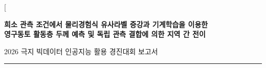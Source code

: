 \documentclass[10pt,twocolumn]{article}
\begin{document}
\pagestyle{plain}
\raggedbottom

\twocolumn[%
\begin{@twocolumnfalse}
\begin{center}
{\headfont\cjkhead\LARGE\bfseries
희소 관측 조건에서 물리경험식 유사라벨 증강과 기계학습을 이용한\\[3pt]
영구동토 활동층 두께 예측 및 독립 관측 결합에 의한 지역 간 전이\par}
\vspace{7pt}
{\headfont\cjkhead\normalsize
2026 극지 빅데이터 인공지능 활용 경진대회 보고서\par}
\vspace{4pt}
\rule{0.5\textwidth}{0.4pt}
\end{center}
\vspace{4pt}


\end{@twocolumnfalse}
\end{document}
